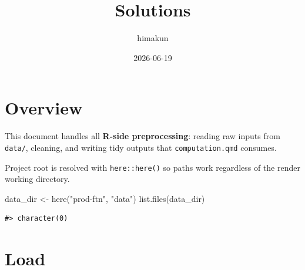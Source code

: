\documentclass[
]{article}
\title{Solutions}
\author{himakun}
\date{2026-06-19}
\newenvironment{Shaded}{\begin{snugshade}}{\end{snugshade}}
\newcommand{\AttributeTok}[1]{\textcolor[rgb]{0.40,0.45,0.13}{#1}}
\newcommand{\CommentTok}[1]{\textcolor[rgb]{0.37,0.37,0.37}{#1}}
\newcommand{\ConstantTok}[1]{\textcolor[rgb]{0.56,0.35,0.01}{#1}}
\newcommand{\FunctionTok}[1]{\textcolor[rgb]{0.28,0.35,0.67}{#1}}
\newcommand{\NormalTok}[1]{\textcolor[rgb]{0.00,0.23,0.31}{#1}}
\newcommand{\OtherTok}[1]{\textcolor[rgb]{0.00,0.23,0.31}{#1}}
\newcommand{\SpecialCharTok}[1]{\textcolor[rgb]{0.37,0.37,0.37}{#1}}
\newcommand{\StringTok}[1]{\textcolor[rgb]{0.13,0.47,0.30}{#1}}
\renewcommand*\contentsname{Table of contents}
\newcommand\contentsname{Table of contents}
\begin{document}
\maketitle

\renewcommand*\contentsname{Table of contents}
{
\hypersetup{linkcolor=}
\setcounter{tocdepth}{3}
\tableofcontents
}

\section{Overview}\label{overview}

This document handles all \textbf{R-side preprocessing}: reading raw
inputs from \texttt{data/}, cleaning, and writing tidy outputs that
\texttt{computation.qmd} consumes.

Project root is resolved with \texttt{here::here()} so paths work
regardless of the render working directory.

\begin{Shaded}
\begin{Highlighting}[]
\NormalTok{data\_dir }\OtherTok{\textless{}{-}} \FunctionTok{here}\NormalTok{(}\StringTok{"prod{-}ftn"}\NormalTok{, }\StringTok{"data"}\NormalTok{)}
\FunctionTok{list.files}\NormalTok{(data\_dir)}
\end{Highlighting}
\end{Shaded}

\begin{verbatim}
#> character(0)
\end{verbatim}

\section{Load}\label{load}

\begin{Shaded}
\end{Shaded}
\end{document}
